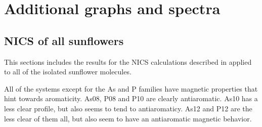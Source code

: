 \chapter{Additional graphs and spectra}

\newpage
\section{NICS of all sunflowers}
This sections includes the results for the NICS calculations described in  applied to all of the isolated sunflower molecules.

All of the systems except for the As and P families have magnetic properties that hint towards aromaticity.
As08, P08 and P10 are clearly antiaromatic.
As10 has a less clear profile, but also seems to tend to antiaromaticy.
As12 and P12 are the less clear of them all, but also seem to have an antiaromatic magnetic behavior.


